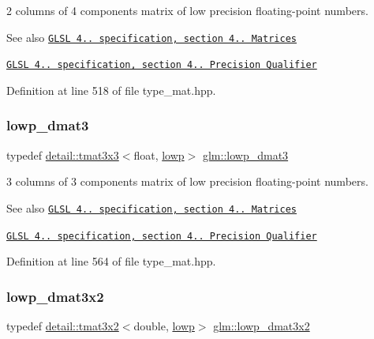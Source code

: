 2 columns of 4 components matrix of low precision floating-\/point numbers.

\begin{DoxySeeAlso}{See also}
\href{http://www.opengl.org/registry/doc/GLSLangSpec.4.20.8.pdf}{\tt G\+L\+SL 4.. specification, section 4.. Matrices} 

\href{http://www.opengl.org/registry/doc/GLSLangSpec.4.20.8.pdf}{\tt G\+L\+SL 4.. specification, section 4.. Precision Qualifier} 
\end{DoxySeeAlso}


Definition at line 518 of file type\+\_\+mat.\+hpp.

\mbox{\label{group__core__precision_ga07d9423bdde2d7ff880d6ece01dc9e32}} 
\subsubsection{\texorpdfstring{lowp\+\_\+dmat3}{lowp\_dmat3}}
{\footnotesize\ttfamily typedef \hyperlink{structglm_1_1detail_1_1tmat3x3}{detail\+::tmat3x3}$<$float, \hyperlink{namespaceglm_a0f04f086094c747d227af4425893f545ae161af3fc695e696ce3bf69f7332bc2d}{lowp}$>$ \hyperlink{group__core__precision_ga07d9423bdde2d7ff880d6ece01dc9e32}{glm\+::lowp\+\_\+dmat3}}

3 columns of 3 components matrix of low precision floating-\/point numbers.

\begin{DoxySeeAlso}{See also}
\href{http://www.opengl.org/registry/doc/GLSLangSpec.4.20.8.pdf}{\tt G\+L\+SL 4.. specification, section 4.. Matrices} 

\href{http://www.opengl.org/registry/doc/GLSLangSpec.4.20.8.pdf}{\tt G\+L\+SL 4.. specification, section 4.. Precision Qualifier} 
\end{DoxySeeAlso}


Definition at line 564 of file type\+\_\+mat.\+hpp.

\mbox{\label{group__core__precision_ga678c21e4fadeda255cfb146d40844bdd}} 
\subsubsection{\texorpdfstring{lowp\+\_\+dmat3x2}{lowp\_dmat3x2}}
{\footnotesize\ttfamily typedef \hyperlink{structglm_1_1detail_1_1tmat3x2}{detail\+::tmat3x2}$<$double, \hyperlink{namespaceglm_a0f04f086094c747d227af4425893f545ae161af3fc695e696ce3bf69f7332bc2d}{lowp}$>$ \hyperlink{group__core__precision_ga678c21e4fadeda255cfb146d40844bdd}{glm\+::lowp\+\_\+dmat3x2}}


